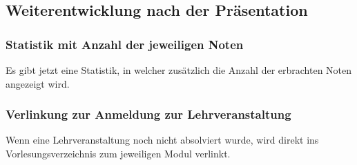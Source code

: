 \documentclass[a4paper,10pt]{scrartcl}
\begin{document}
\subsection{Weiterentwicklung nach der Präsentation}

\subsubsection*{Statistik mit Anzahl der jeweiligen Noten}

Es gibt jetzt eine Statistik, in welcher zusätzlich die Anzahl der erbrachten Noten angezeigt wird.

\noindent{}
\medskip

\subsubsection*{Verlinkung zur Anmeldung zur Lehrveranstaltung}

Wenn eine Lehrveranstaltung noch nicht absolviert wurde, wird direkt ins Vorlesungsverzeichnis zum jeweiligen Modul verlinkt.

\noindent{}
\medskip
\end{document}
